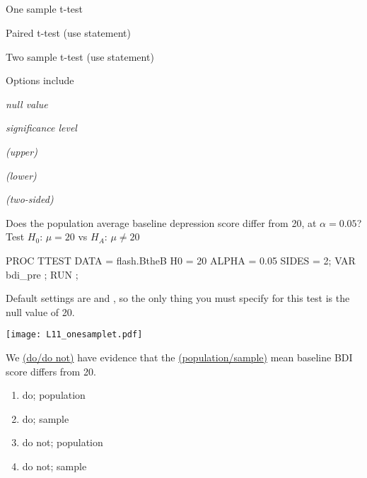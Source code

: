 \subsection{}
\begin{frame}
\end{frame}

\begin{frame}
\bi
\item One sample t-test
\item Paired t-test (use  statement)
\item Two sample t-test (use  statement)
\item[]
\item Options include
\bi
\item {} \emph{null value}
\item {} \emph{significance level}
\item {}  \emph{(upper)}
    \item[] \hspace{0.44in}  \emph{(lower)}
    \item[] \hspace{0.44in}   \emph{(two-sided)}
\ei
\ei
\end{frame}

\begin{frame}[fragile]
Does the population average baseline depression score differ from 20, at $\alpha=0.05$?  Test $H_0$: $\mu=20$ vs  $H_A$:  $\mu \neq 20$ \\
\vskip10pt
\footnotesize
\begin{code}{.0}
PROC TTEST DATA = flash.BtheB H0 = 20 ALPHA = 0.05 SIDES = 2;
    VAR bdi_pre ;
RUN ;
\end{code}
\emp
\vskip10pt
Default settings are  and , so the only thing you must specify for this test is the null value of 20.
\end{frame}


\begin{frame}[fragile]
\texttt{[image: L11\_onesamplet.pdf]}
\emp
{} \hspace{1in} \emp
{}
\begin{clicker}{We \underline{(do/do not)} have evidence that the \underline{(population/sample)} mean baseline BDI score differs from 20.}
\begin{enumerate}
\item do; population
\item do; sample
\item do not; population
\item do not; sample
\end{enumerate}
\end{clicker}
\emp
\end{frame}


